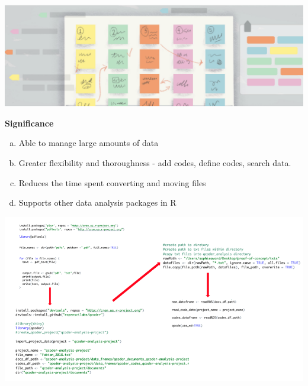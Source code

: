 \documentclass[unknownkeysallowed,usepdftitle=false, parskip=full]{beamer}
\newcommand{\secvariable}{nothing}
\newcommand{\mysection}[1]{\renewcommand{\secvariable}{#1}
}
\begin{document}
\mysection{line}
\begin{frame}\label{\secvariable}
\begin{center}
  \vspace{-0.5cm}
 \includegraphics[width=1\textwidth,height=0.75\textheight,keepaspectratio]{figure10.png}
\end{center}
  \vspace{-0.5cm}
  
  \textbf{Significance}
  \begin{enumerate}[(a)]
  \item Able to manage large amounts of data 
  \item Greater flexibility and thoroughness - add codes, define codes, search data. 
  \item Reduces the time spent converting and moving files 
  \item Supports other data analysis packages in R
  \end{enumerate}

  
\end{frame}


\mysection{slab}
\begin{frame}\label{\secvariable}
\begin{center}
\includegraphics[width=1\textwidth,height=0.75\textheight,keepaspectratio]{figure5.png}
\end{center}
    \parbox{\linewidth}{
 \hyperlink{slabtable}{}
}

\end{frame}
\end{document}
